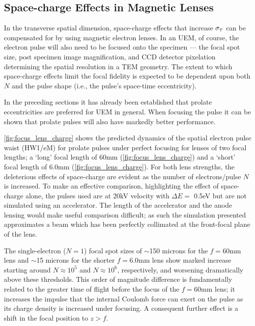 \subsection{Space-charge Effects in Magnetic Lenses} \label{sec:mag_lens_charge}

In the transverse spatial dimension, space-charge effects that increase $ \sigma_{ {\scriptscriptstyle T} } $ can be compensated for by using magnetic electron lenses.\cite{oudheusden_electron_2007,lagrange_nanosecond_2008}
In an UEM, of course, the electron pulse will also need to be focused onto the specimen --- the focal spot size, post specimen image magnification, and CCD detector pixelation determining the spatial resolution in a TEM geometry.\cite{berger_dc_2009}
The extent to which space-charge effects limit the focal fidelity is expected to be dependent upon both $N$ and the pulse shape (i.e., the pulse's space-time eccentricity).

In the preceding sections it has already been established that prolate eccentricities are preferred for UEM in general.
When focusing the pulse it can be shown that prolate pulses will also have markedly better performance.



\ref{fig:focus_lens_charge} shows the predicted dynamics of the spatial electron pulse waist (HW1/eM) for prolate pulses under perfect focusing for lenses of two focal lengths; a `long' focal length of 60mm (\ref{fig:focus_lens_charge}) and a `short' focal length of 6.0mm (\ref{fig:focus_lens_charge}).
For both lens strengths, the deleterious effects of space-charge are evident as the number of electrons/pulse $ N $ is increased.
To make an effective comparison, highlighting the effect of space-charge alone, the pulses used are at 20kV velocity with $\Delta E = $ 0.5eV but are not simulated using an accelerator.
The length of the accelerator and the anode lensing would make useful comparison difficult; as such the simulation presented approximates a beam which has been perfectly collimated at the front-focal plane of the lens.

The single-electron ($ N = 1 $) focal spot sizes of $\sim$150 microns for the $ f = 60 \text{mm} $ lens and $\sim$15 microns for the shorter $ f = 6.0 \text{mm} $ lens show marked increase starting around $ N \approx 10^{ 5 } $ and $ N \approx 10^{ 6 }$, respectively, and worsening dramatically above these thresholds.
This order of magnitude difference is fundamentally related to the greater time of flight before the focus of the $ f = 60\text{mm} $ lens; it increases the impulse that the internal Coulomb force can exert on the pulse as its charge density is increased under focusing.
A consequent further effect is a shift in the focal position to $ z > f $.


